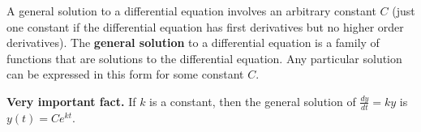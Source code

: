 \documentclass[main]{subfiles}
\begin{document}
\begin{framed}
A  general solution to a differential equation involves an arbitrary constant $C$ (just one constant if the differential equation has first derivatives but no higher order derivatives). The \textbf{general solution} to a differential equation  is a family of functions that are solutions to the differential equation. Any particular solution can be expressed in this form for some constant  $C$.
\end{framed}

\clearpage
  \begin{framed}
    \textbf{Very important fact.}  If $k$ is a constant, then the general
    solution of $\frac{dy}{dt}=ky$ is $y(t) = C
    e^{kt}$.
  \end{framed}


\end{document}
